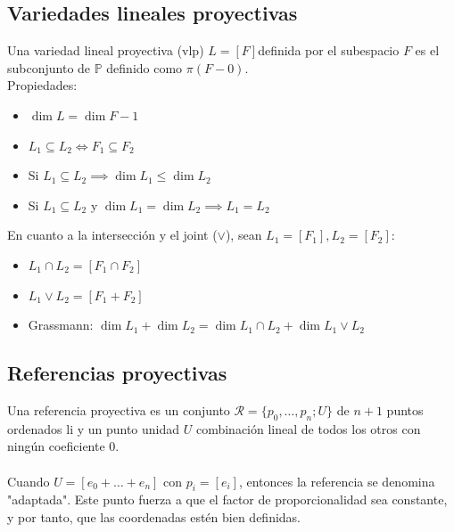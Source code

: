 \documentclass[leqno]{article}
\newcommand{\K}{\mathbb{K}}
\renewcommand{\P}{\mathbb{P}}
\newcommand{\Rcal}{\mathcal{R}}
\begin{document}



\subsection{Variedades lineales proyectivas}
Una variedad lineal proyectiva (vlp) $L = [F]$definida por el subespacio $F$ es el subconjunto de $\P$ definido como $\pi(F-{0})$. \\
Propiedades:
\begin{itemize}
 \item $\dim L = \dim F - 1$
 \item $L_1 \subseteq L_2 \iff F_1\subseteq F_2$
 \item Si $L_1\subseteq L_2 \implies \dim L_1 \leq \dim L_2$
 \item Si $L_1 \subseteq L_2 $ y $\dim L_1 = \dim L_2 \implies L_1 = L_2$
\end{itemize}
En cuanto a la intersección y el joint ($\vee$), sean $L_1 = [F_1], L_2 = [F_2]$:
\begin{itemize}
 \item $L_1\cap L_2 = [F_1\cap F_2]$
 \item $L_1\vee L_2 = [F_1 + F_2]$
 \item Grassmann: $ \dim L_1 + \dim L_2 = \dim L_1\cap L_2 + \dim L_1\vee L_2$
\end{itemize}

\subsection{Referencias proyectivas}
Una referencia proyectiva es un conjunto $\Rcal = \{p_0, \ldots, p_n; U\}$ de $n+1$ puntos ordenados li y un punto unidad $U$ combinación lineal de todos los otros con ningún coeficiente 0. \\
\\
Cuando $U = [e_0 + \ldots + e_n]$ con $p_i = [e_i]$, entonces la referencia se denomina "adaptada". Este punto fuerza a que el factor de proporcionalidad sea constante, y por tanto, que las coordenadas estén bien definidas.
\end{document}
